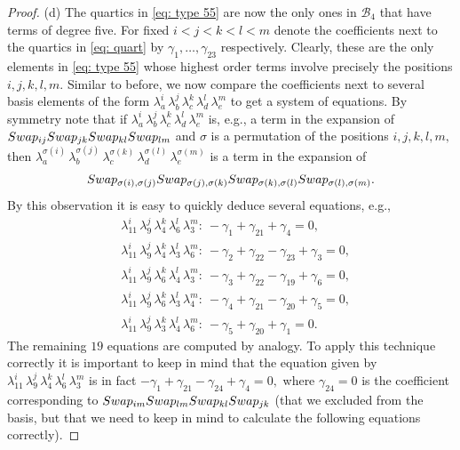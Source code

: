 \documentclass[10pt,a4paper]{amsart}
\begin{document}
\begin{proof}
(d) The quartics in \eqref{eq: type 55} are now the only ones in $\mathcal{B}_4$ that have terms of degree five.
For fixed $i<j<k<l<m$ denote the coefficients next to the quartics in \eqref{eq: quart} by $\gamma_1,\ldots,\gamma_{23}$ respectively.
Clearly, these are the only elements in \eqref{eq: type 55} whose highest order terms involve precisely the positions $i,j,k,l,m.$ Similar to before, we now compare the coefficients next to several basis elements 
of the form $\lambda_a^i\, \lambda_b^j\, \lambda_c^k\, \lambda_d^l\, \lambda_e^m$ to get a system of equations. By symmetry note that  if  $\lambda_a^i\, \lambda_b^j\, \lambda_c^k\, \lambda_d^l\, \lambda_e^m$ is, e.g., a term in the expansion of $\textnormal{Swap}_{ij} \textnormal{Swap}_{jk} \textnormal{Swap}_{kl} \textnormal{Swap}_{lm}$ and $\sigma$ is a permutation of the positions $i,j,k,l,m,$ then $\lambda_a^{\sigma(i)}\, \lambda_b^{\sigma(j)}\, \lambda_c^{\sigma(k)}\, \lambda_d^{\sigma(l)}\, \lambda_e^{\sigma(m)}$ is a term in the expansion of $$\textnormal{Swap}_{\sigma(i),\sigma(j)} \textnormal{Swap}_{\sigma(j),\sigma(k)} \textnormal{Swap}_{\sigma(k),\sigma(l)} \textnormal{Swap}_{\sigma(l),\sigma(m)}.$$
By this observation it is easy to quickly deduce several equations, e.g.,
\begin{equation}\label{eq: t5-eq}
	\begin{split}
	&\lambda_{11}^i\, \lambda_9^j\, \lambda_4^k\, \lambda_6^l\, \lambda_3^m: \ 
	-\gamma_1 + \gamma_{21}+\gamma_4 = 0,\\
	&\lambda_{11}^i\, \lambda_9^j\, \lambda_4^k\, \lambda_3^l\, \lambda_6^m: \ 
	-\gamma_2 + \gamma_{22} - \gamma_{23} +\gamma_3 = 0,\\
	&\lambda_{11}^i\, \lambda_9^j\, \lambda_6^k\, \lambda_4^l\, \lambda_3^m: \ 
	-\gamma_3 + \gamma_{22} - \gamma_{19} +\gamma_6 = 0,\\
	&\lambda_{11}^i\, \lambda_9^j\, \lambda_6^k\, \lambda_3^l\, \lambda_4^m: \ 
	-\gamma_4 + \gamma_{21} - \gamma_{20} +\gamma_5 = 0,\\
	&\lambda_{11}^i\, \lambda_9^j\, \lambda_3^k\, \lambda_4^l\, \lambda_6^m: \ 
	-\gamma_5 + \gamma_{20} +\gamma_1 = 0.
	\end{split}
\end{equation}
    The remaining $19$ equations are computed by analogy.
	To apply this technique correctly it is important to keep in mind that  the equation given by $\lambda_{11}^i\, \lambda_9^j\, \lambda_4^k\, \lambda_6^l\, \lambda_3^m$ is in fact $-\gamma_1 + \gamma_{21} - \gamma_{24} +\gamma_4 = 0,$ where $\gamma_{24} = 0$ is the coefficient corresponding to $\textnormal{Swap}_{im} \textnormal{Swap}_{lm} \textnormal{Swap}_{kl} \textnormal{Swap}_{jk}$ (that we excluded from the basis, but that we need to keep in mind to calculate the following equations correctly). 

\end{proof}
\end{document}
